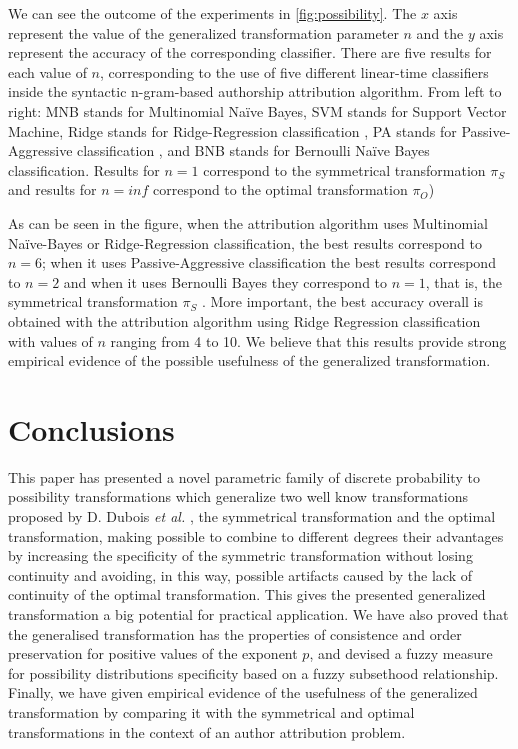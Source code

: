 \documentclass[a4paper]{article}
\begin{document}
We can see the outcome of the experiments in \ref{fig:possibility}. The $x$ axis represent the value of the generalized transformation parameter $n$ and the $y$ axis represent the accuracy of the corresponding classifier. There are five results for each value of $n$, corresponding to the use of five different linear-time classifiers inside the syntactic n-gram-based authorship attribution algorithm. From left to right: MNB stands for Multinomial Naïve Bayes, SVM stands for Support Vector Machine, Ridge stands for Ridge-Regression classification \cite{dobriban2018}, PA stands for Passive-Aggressive classification \cite{Matsu}, and BNB stands for Bernoulli Naïve Bayes classification. Results for $n=1$ correspond to the symmetrical transformation $\pi_S$ and results for $n=inf$ correspond to the optimal transformation $\pi_O$)

As can be seen in the figure, when the attribution algorithm uses Multinomial Naïve-Bayes or Ridge-Regression classification, the best results correspond to $n = 6$; when it uses Passive-Aggressive classification the best results correspond to $n=2$ and when it uses Bernoulli Bayes they correspond to $n=1$, that is, the symmetrical transformation $\pi_{S}$ . More important, the best accuracy overall is obtained with the attribution algorithm using Ridge Regression classification with values of $n$ ranging from 4 to 10. We believe that this results provide strong empirical evidence of the possible usefulness of the generalized transformation. 

\section{Conclusions}
This paper has presented a novel parametric family of discrete probability to possibility transformations which generalize two well know transformations proposed by D. Dubois \textit{et al.} \cite{Dubois82, Dubois1993}, the symmetrical transformation and the optimal transformation, making possible to combine to different degrees their advantages by increasing the specificity of the symmetric transformation without losing continuity and avoiding, in this way, possible artifacts caused by the lack of continuity of the optimal transformation. This gives the presented generalized transformation a big potential for practical application.
We have also proved that the generalised transformation has the properties of consistence and order preservation for positive values of the exponent $p$, and devised a fuzzy measure for possibility distributions specificity based on a fuzzy subsethood relationship. Finally, we have given empirical evidence of the usefulness of the generalized transformation by comparing it with the symmetrical and optimal transformations in the context of an author attribution problem.
\end{document}
